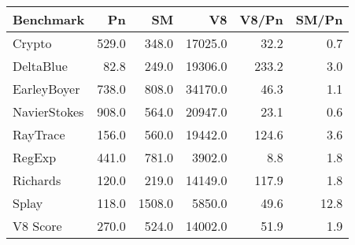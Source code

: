 \begin{tabular}{|l|r|r|r|r|r|}
  \hline
  Benchmark & Pn & SM & V8 & V8/Pn & SM/Pn \\
  \hline \hline
  Crypto & 529.0 & 348.0 & 17025.0 & 32.2 & 0.7\\
  \hline
  DeltaBlue & 82.8 & 249.0 & 19306.0 & 233.2 & 3.0\\
  \hline
  EarleyBoyer & 738.0 & 808.0 & 34170.0 & 46.3 & 1.1\\
  \hline
  NavierStokes & 908.0 & 564.0 & 20947.0 & 23.1 & 0.6\\
  \hline
  RayTrace & 156.0 & 560.0 & 19442.0 & 124.6 & 3.6\\
  \hline
  RegExp & 441.0 & 781.0 & 3902.0 & 8.8 & 1.8\\
  \hline
  Richards & 120.0 & 219.0 & 14149.0 & 117.9 & 1.8\\
  \hline
  Splay & 118.0 & 1508.0 & 5850.0 & 49.6 & 12.8\\
  \hline
  \hline
  V8 Score & 270.0 & 524.0 & 14002.0 & 51.9 & 1.9\\
  \hline
\end{tabular}
